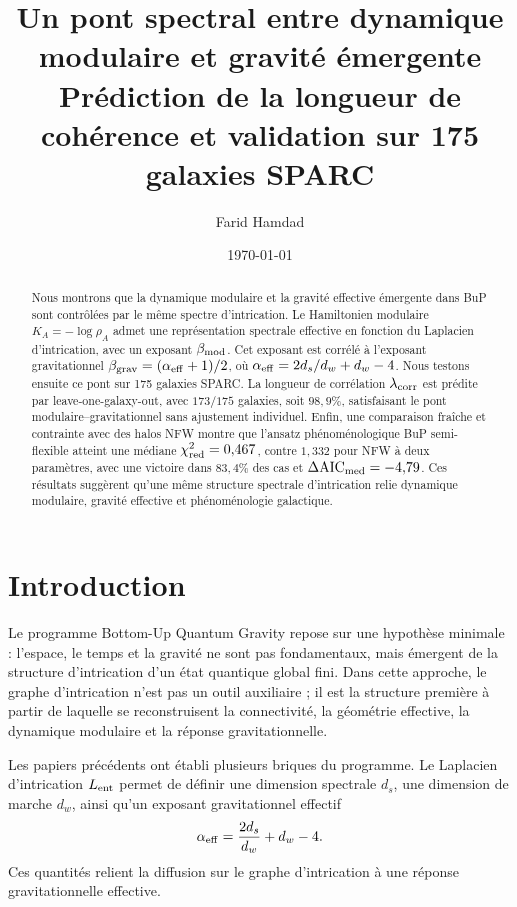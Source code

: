 \documentclass[11pt,a4paper]{article}
\title{
\textbf{Un pont spectral entre dynamique modulaire et gravité émergente}\\
\large Prédiction de la longueur de cohérence et validation sur 175 galaxies SPARC
}
\author{Farid Hamdad}
\date{\today}
\begin{document}
\maketitle

\begin{abstract}
Nous montrons que la dynamique modulaire et la gravité effective émergente
dans BuP sont contrôlées par le même spectre d'intrication. Le Hamiltonien
modulaire \(K_A=-\log\rho_A\) admet une représentation spectrale effective
en fonction du Laplacien d'intrication, avec un exposant
\(\beta_{\rm mod}\). Cet exposant est corrélé à l'exposant gravitationnel
\(\beta_{\rm grav}=(\alpha_{\rm eff}+1)/2\), où
\(\alpha_{\rm eff}=2d_s/d_w+d_w-4\). Nous testons ensuite ce pont sur 175
galaxies SPARC. La longueur de corrélation \(\lambda_{\rm corr}\) est prédite
par leave-one-galaxy-out, avec \(173/175\) galaxies, soit \(98{,}9\%\),
satisfaisant le pont modulaire--gravitationnel sans ajustement individuel.
Enfin, une comparaison fraîche et contrainte avec des halos NFW montre que
l'ansatz phénoménologique BuP semi-flexible atteint une médiane
\(\chi^2_{\rm red}=0{,}467\), contre \(1{,}332\) pour NFW à deux paramètres,
avec une victoire dans \(83{,}4\%\) des cas et
\(\Delta{\rm AIC}_{\rm med}=-4{,}79\). Ces résultats suggèrent qu'une même
structure spectrale d'intrication relie dynamique modulaire, gravité
effective et phénoménologie galactique.
\end{abstract}

\tableofcontents

\section{Introduction}

Le programme Bottom-Up Quantum Gravity repose sur une hypothèse minimale :
l'espace, le temps et la gravité ne sont pas fondamentaux, mais émergent de
la structure d'intrication d'un état quantique global fini. Dans cette
approche, le graphe d'intrication n'est pas un outil auxiliaire ; il est la
structure première à partir de laquelle se reconstruisent la connectivité,
la géométrie effective, la dynamique modulaire et la réponse gravitationnelle.

Les papiers précédents ont établi plusieurs briques du programme. Le
Laplacien d'intrication \(L_{\rm ent}\) permet de définir une dimension
spectrale \(d_s\), une dimension de marche \(d_w\), ainsi qu'un exposant
gravitationnel effectif
\[
\alpha_{\rm eff}
=
\frac{2d_s}{d_w}+d_w-4.
\]
Ces quantités relient la diffusion sur le graphe d'intrication à une réponse
gravitationnelle effective.
\end{document}
